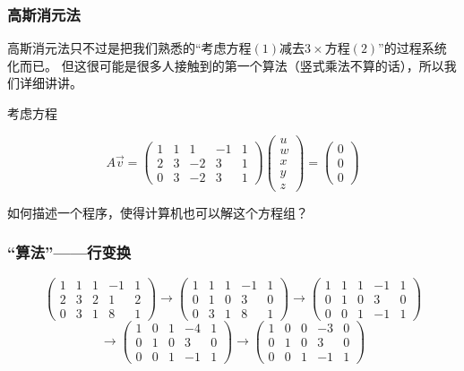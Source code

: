 \documentclass[CJK]{beamer}
\begin{document}
\begin{frame}
\frametitle{高斯消元法}
	高斯消元法只不过是把我们熟悉的``考虑方程$(1)$减去$3\times$方程$(2)$''的过程\alert{系统化}而已。
	但这很可能是很多人接触到的第一个\alert{算法}（竖式乘法不算的话），所以我们详细讲讲。

考虑方程

\[
A\vec{v} = \begin{pmatrix} 1 & 1 & 1 & -1 & 1 \\ 2 & 3 & -2 & 3 & 1 \\ 0 & 3 & -2 & 3 & 1 \end{pmatrix} \begin{pmatrix} u \\ w \\ x \\ y \\ z \end{pmatrix} = \begin{pmatrix} 0 \\ 0 \\ 0 \end{pmatrix}
\]

如何\alert{描述一个程序}，使得计算机也可以解这个方程组？

\end{frame}

\begin{frame}
\frametitle{``算法''——行变换}
\[
\begin{pmatrix} 
1 & 1 & 1 & -1 & 1 \\ 
2 & 3 & 2 & 1 & 2 \\ 
0 & 3 & 1 & 8 & 1 
\end{pmatrix} \rightarrow
\begin{pmatrix} 
1 & 1 & 1 & -1 & 1 \\ 
0 & 1 & 0 & 3 & 0 \\ 
0 & 3 & 1 & 8 & 1 
\end{pmatrix} \rightarrow
\begin{pmatrix} 
1 & 1 & 1 & -1 & 1 \\ 
0 & 1 & 0 & 3 & 0 \\ 
0 & 0 & 1 & -1 & 1 
\end{pmatrix} 
\]
\[
\rightarrow
\begin{pmatrix} 
1 & 0 & 1 & -4 & 1 \\ 
0 & 1 & 0 & 3 & 0 \\ 
0 & 0 & 1 & -1 & 1 
\end{pmatrix} 
\rightarrow
\begin{pmatrix} 
1 & 0 & 0 & -3 & 0 \\ 
0 & 1 & 0 & 3 & 0 \\ 
0 & 0 & 1 & -1 & 1 
\end{pmatrix} 
\]
\end{frame}
\end{document}
